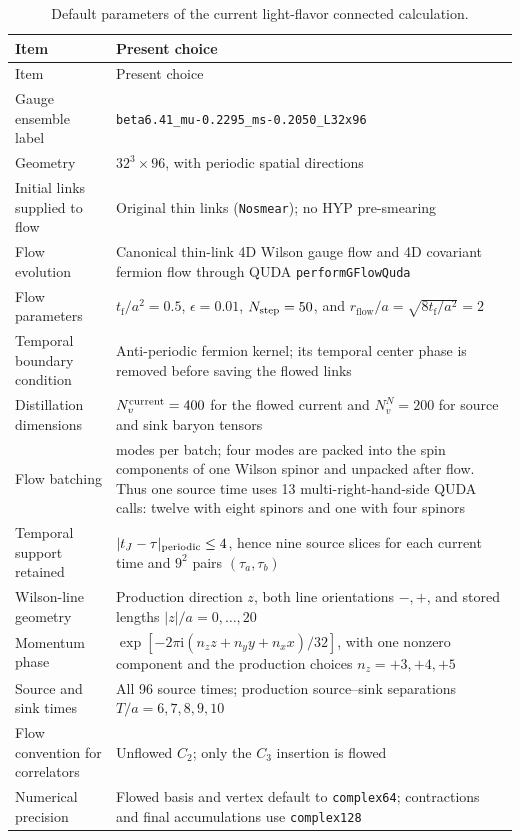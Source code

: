 \documentclass[11pt]{article}
\numberwithin{equation}{section}
\newcommand{\ii}{\mathrm{i}}
\newcommand{\rflow}{r_{\mathrm{flow}}}
\newcommand{\tf}{t_{\mathrm f}}
\begin{document}
\begin{longtable}{
  >{\raggedright\arraybackslash}p{}
  >{\raggedright\arraybackslash}p{}}
  \caption{Default parameters of the current light-flavor connected
  calculation.}\label{tab:implementation}\\
  \toprule
  Item & Present choice \\
  \midrule
  \endfirsthead
  \toprule
  Item & Present choice \\
  \midrule
  \endhead
  Gauge ensemble label
  & \texttt{beta6.41\_mu-0.2295\_ms-0.2050\_L32x96} \\
  Geometry
  & \(32^3\times96\), with periodic spatial directions \\
  Initial links supplied to flow
  & Original thin links (\texttt{Nosmear}); no HYP pre-smearing \\
  Flow evolution
  & Canonical thin-link 4D Wilson gauge flow and 4D covariant fermion flow
    through QUDA \texttt{performGFlowQuda} \\
  Flow parameters
  & \(\tf/a^2=0.5\), \(\epsilon=0.01\), \(N_{\rm step}=50\), and
    \(\rflow/a=\sqrt{8\tf/a^2}=2\) \\
  Temporal boundary condition
  & Anti-periodic fermion kernel; its temporal center phase is removed before
    saving the flowed links \\
  Distillation dimensions
  & \(N_v^{\rm current}=400\) for the flowed current and
    \(N_v^{N}=200\) for source and sink baryon tensors \\
  Flow batching
  & 32 modes per batch; four modes are packed into the spin components of one
    Wilson spinor and unpacked after flow.  Thus one source time uses 13
    multi-right-hand-side QUDA calls: twelve with eight spinors and one with
    four spinors \\
  Temporal support retained
  & \(|t_J-\tau|_{\rm periodic}\leq4\), hence nine source slices for each
    current time and \(9^2\) pairs \((\tau_a,\tau_b)\) \\
  Wilson-line geometry
  & Production direction \(z\), both line orientations \(-,+\), and stored
    lengths \(|z|/a=0,\ldots,20\) \\
  Momentum phase
  & \(\exp[-2\pi\ii(n_z z+n_y y+n_x x)/32]\), with one nonzero component and
    the production choices \(n_z=+3,+4,+5\) \\
  Source and sink times
  & All 96 source times; production source--sink separations
    \(T/a=6,7,8,9,10\) \\
  Flow convention for correlators
  & Unflowed \(C_2\); only the \(C_3\) insertion is flowed \\
  Numerical precision
  & Flowed basis and vertex default to \texttt{complex64}; contractions and
    final accumulations use \texttt{complex128} \\
  \bottomrule
\end{longtable}
\end{document}
